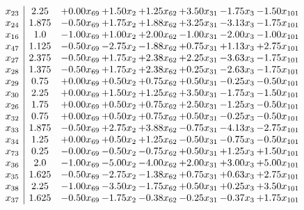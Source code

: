 \documentclass[8pt]{article}
\begin{document}
\[\begin{array}{c| c c@{\hskip 2pt} c@{\hskip 2pt} c@{\hskip 2pt} c@{\hskip 2pt} c@{\hskip 2pt} c@{\hskip 2pt} }
 x_{23}   &  2.25 & +  0.00 x_{69} & +  1.50 x_{2} & +  1.25 x_{62} & +  3.50 x_{31} & -1.75 x_{3} & -1.50 x_{101}\\
 x_{24}   &  1.875 & -0.50 x_{69} & +  1.75 x_{2} & +  1.88 x_{62} & +  3.25 x_{31} & -3.13 x_{3} & -1.75 x_{101}\\
 x_{16}   &  1.0 & -1.00 x_{69} & +  1.00 x_{2} & +  2.00 x_{62} & -1.00 x_{31} & -2.00 x_{3} & -1.00 x_{101}\\
 x_{47}   &  1.125 & -0.50 x_{69} & -2.75 x_{2} & -1.88 x_{62} & +  0.75 x_{31} & +  1.13 x_{3} & +  2.75 x_{101}\\
 x_{27}   &  2.375 & -0.50 x_{69} & +  1.75 x_{2} & +  2.38 x_{62} & +  2.25 x_{31} & -3.63 x_{3} & -1.75 x_{101}\\
 x_{28}   &  1.375 & -0.50 x_{69} & +  1.75 x_{2} & +  2.38 x_{62} & +  0.25 x_{31} & -2.63 x_{3} & -1.75 x_{101}\\
 x_{29}   &  0.75 & +  0.00 x_{69} & +  0.50 x_{2} & +  0.75 x_{62} & +  0.50 x_{31} & -0.25 x_{3} & -0.50 x_{101}\\
 x_{30}   &  2.25 & +  0.00 x_{69} & +  1.50 x_{2} & +  1.25 x_{62} & +  3.50 x_{31} & -1.75 x_{3} & -1.50 x_{101}\\
 x_{26}   &  1.75 & +  0.00 x_{69} & +  0.50 x_{2} & +  0.75 x_{62} & +  2.50 x_{31} & -1.25 x_{3} & -0.50 x_{101}\\
 x_{32}   &  0.75 & +  0.00 x_{69} & +  0.50 x_{2} & +  0.75 x_{62} & +  0.50 x_{31} & -0.25 x_{3} & -0.50 x_{101}\\
 x_{33}   &  1.875 & -0.50 x_{69} & +  2.75 x_{2} & +  3.88 x_{62} & -0.75 x_{31} & -4.13 x_{3} & -2.75 x_{101}\\
 x_{34}   &  1.25 & +  0.00 x_{69} & +  0.50 x_{2} & +  1.25 x_{62} & -0.50 x_{31} & -0.75 x_{3} & -0.50 x_{101}\\
 x_{73}   &  0.25 & -0.00 x_{69} & -0.50 x_{2} & -0.75 x_{62} & +  0.50 x_{31} & +  1.25 x_{3} & +  1.50 x_{101}\\
 x_{36}   &  2.0 & -1.00 x_{69} & -5.00 x_{2} & -4.00 x_{62} & +  2.00 x_{31} & +  3.00 x_{3} & +  5.00 x_{101}\\
 x_{35}   &  1.625 & -0.50 x_{69} & -2.75 x_{2} & -1.38 x_{62} & +  0.75 x_{31} & +  0.63 x_{3} & +  2.75 x_{101}\\
 x_{38}   &  2.25 & -1.00 x_{69} & -3.50 x_{2} & -1.75 x_{62} & +  0.50 x_{31} & +  0.25 x_{3} & +  3.50 x_{101}\\
 x_{37}   &  1.625 & -0.50 x_{69} & -1.75 x_{2} & -0.38 x_{62} & -0.25 x_{31} & -0.37 x_{3} & +  1.75 x_{101}\\

\end{array}\]
\end{document}
